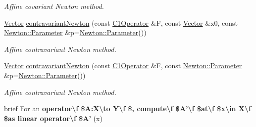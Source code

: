\begin{DoxyCompactItemize}
\begin{DoxyCompactList}\small\item\em Affine covariant Newton method. \end{DoxyCompactList}\item 
\hyperlink{classSpacy_1_1Vector}{Vector} \hyperlink{group__NewtonGroup_gaa32f667c573986b2b2721ec6532fc832}{contravariant\-Newton} (const \hyperlink{classSpacy_1_1C1Operator}{C1\-Operator} \&F, const \hyperlink{classSpacy_1_1Vector}{Vector} \&x0, const \hyperlink{structSpacy_1_1Newton_1_1Parameter}{Newton\-::\-Parameter} \&p=\hyperlink{structSpacy_1_1Newton_1_1Parameter}{Newton\-::\-Parameter}())
\begin{DoxyCompactList}\small\item\em Affine contravariant Newton method. \end{DoxyCompactList}\item 
\hyperlink{classSpacy_1_1Vector}{Vector} \hyperlink{group__NewtonGroup_gace045630c7f0c7a1a5a48d2d0807f608}{contravariant\-Newton} (const \hyperlink{classSpacy_1_1C1Operator}{C1\-Operator} \&F, const \hyperlink{structSpacy_1_1Newton_1_1Parameter}{Newton\-::\-Parameter} \&p=\hyperlink{structSpacy_1_1Newton_1_1Parameter}{Newton\-::\-Parameter}())
\begin{DoxyCompactList}\small\item\em Affine contravariant Newton method. \end{DoxyCompactList}\item 
\hypertarget{namespaceSpacy_af104a29d68fb6456808d0adbb98cebeb}{brief For an {\bfseries operator\textbackslash{}f \$\-A\-:\-X\textbackslash{}to Y\textbackslash{}f \$, compute\textbackslash{}f \$\-A'\textbackslash{}f \$at\textbackslash{}f \$x\textbackslash{}in X\textbackslash{}f \$as linear operator\textbackslash{}f \$\-A'} (x)}\label{namespaceSpacy_af104a29d68fb6456808d0adbb98cebeb}


\end{DoxyCompactItemize}
